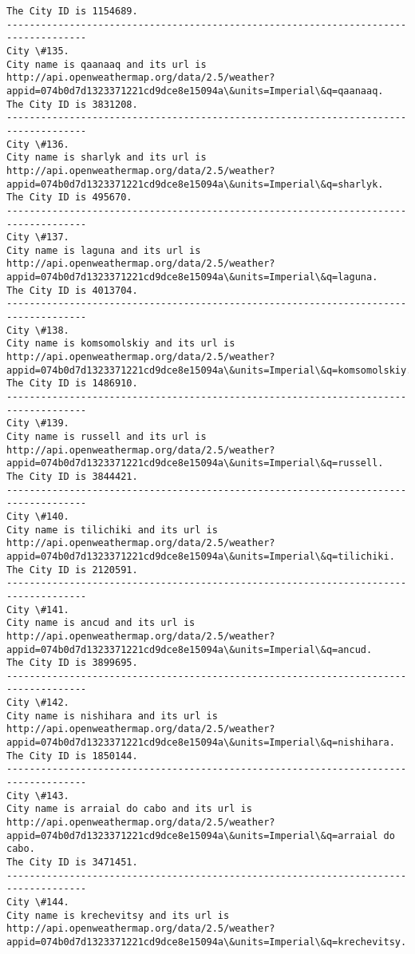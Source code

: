 \documentclass[11pt]{article}
\begin{document}
\begin{Verbatim}[commandchars=\\\{\}]
The City ID is 1154689.
------------------------------------------------------------------------------------
City \#135.
City name is qaanaaq and its url is http://api.openweathermap.org/data/2.5/weather?appid=074b0d7d1323371221cd9dce8e15094a\&units=Imperial\&q=qaanaaq.
The City ID is 3831208.
------------------------------------------------------------------------------------
City \#136.
City name is sharlyk and its url is http://api.openweathermap.org/data/2.5/weather?appid=074b0d7d1323371221cd9dce8e15094a\&units=Imperial\&q=sharlyk.
The City ID is 495670.
------------------------------------------------------------------------------------
City \#137.
City name is laguna and its url is http://api.openweathermap.org/data/2.5/weather?appid=074b0d7d1323371221cd9dce8e15094a\&units=Imperial\&q=laguna.
The City ID is 4013704.
------------------------------------------------------------------------------------
City \#138.
City name is komsomolskiy and its url is http://api.openweathermap.org/data/2.5/weather?appid=074b0d7d1323371221cd9dce8e15094a\&units=Imperial\&q=komsomolskiy.
The City ID is 1486910.
------------------------------------------------------------------------------------
City \#139.
City name is russell and its url is http://api.openweathermap.org/data/2.5/weather?appid=074b0d7d1323371221cd9dce8e15094a\&units=Imperial\&q=russell.
The City ID is 3844421.
------------------------------------------------------------------------------------
City \#140.
City name is tilichiki and its url is http://api.openweathermap.org/data/2.5/weather?appid=074b0d7d1323371221cd9dce8e15094a\&units=Imperial\&q=tilichiki.
The City ID is 2120591.
------------------------------------------------------------------------------------
City \#141.
City name is ancud and its url is http://api.openweathermap.org/data/2.5/weather?appid=074b0d7d1323371221cd9dce8e15094a\&units=Imperial\&q=ancud.
The City ID is 3899695.
------------------------------------------------------------------------------------
City \#142.
City name is nishihara and its url is http://api.openweathermap.org/data/2.5/weather?appid=074b0d7d1323371221cd9dce8e15094a\&units=Imperial\&q=nishihara.
The City ID is 1850144.
------------------------------------------------------------------------------------
City \#143.
City name is arraial do cabo and its url is http://api.openweathermap.org/data/2.5/weather?appid=074b0d7d1323371221cd9dce8e15094a\&units=Imperial\&q=arraial do cabo.
The City ID is 3471451.
------------------------------------------------------------------------------------
City \#144.
City name is krechevitsy and its url is http://api.openweathermap.org/data/2.5/weather?appid=074b0d7d1323371221cd9dce8e15094a\&units=Imperial\&q=krechevitsy.

\end{Verbatim}
\end{document}
